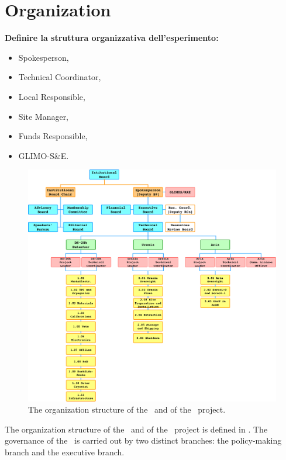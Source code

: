 \section{Organization}
\label{sec:Organization}

{\bf \color{red} Definire la struttura organizzativa dell’esperimento:
\begin{itemize}
\item Spokesperson, 
\item Technical Coordinator,
\item Local Responsible,
\item Site Manager,
\item Funds Responsible,
\item GLIMO-S\&E.
\end{itemize}
}

\vspace{1cm}

\begin{figure}[htbp!]
\includegraphics[width=\textwidth]{./Figures/ManagementChart.pdf}
\caption[The organization structure of the \GADMC\ and of the \DS\ project]{The organization structure of the \GADMC\ and of the \DS\ project.}
\label{fig:ManagementChart}
\end{figure}

The organization structure of the \GADMC\ and of the \DS\ project is defined in . The governance of the \GADMC\ is carried out by two distinct branches: the policy-making branch and the executive branch.

